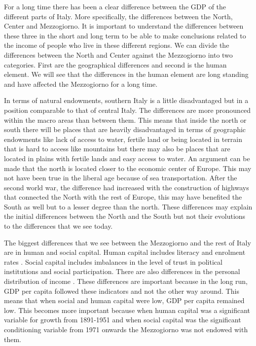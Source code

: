 \documentclass[12pt]{article}
\begin{document}
\begin{spacing}{1.5}

For a long time there has been a clear difference between the GDP of the different parts of Italy. More specifically, the differences between the North, Center and Mezzogiorno. It is important to understand the differences between these three in the short and long term to be able to make conclusions related to the income of people who live in these different regions. We can divide the differences between the North and Center against the Mezzogiorno into two categories. First are the geographical differences and second is the human element. We will see that the differences in the human element are long standing and have affected the Mezzogiorno for a long time.

In terms of natural endowments, southern Italy is a little disadvantaged but in a position comparable to that of central Italy. The differences are more pronounced within the macro areas than between them. This means that inside the north or south there will be places that are heavily disadvantaged in terms of geographic endowments like lack of access to water, fertile land or being located in terrain that is hard to access like mountains but there may also be places that are located in plains with fertile lands and easy access to water. An argument can be made that the north is located closer to the economic center of Europe. This may not have been true in the liberal age because of sea transportation. After the second world war, the difference had increased with the construction of highways that connected the North with the rest of Europe, this may have benefited the South as well but to a lesser degree than the north. These differences may explain the initial differences between the North and the South but not their evolutions to the differences that we see today.

The biggest differences that we see between the Mezzogiorno and the rest of Italy are in human and social capital. Human capital includes literacy and enrolment rates \cite{felice2012regional}. Social capital includes imbalances in the level of trust in political institutions and social participation. There are also differences in the personal distribution of income \cite{felice2013perche}. These differences are important because in the long run, GDP per capita followed these indicators and not the other way around. This means that when social and human capital were low, GDP per capita remained low. This becomes more important because when human capital was a significant variable for growth from 1891-1951 and when social capital was the significant conditioning variable from 1971 onwards the Mezzogiorno was not endowed with them.


\end{spacing}
\end{document}
